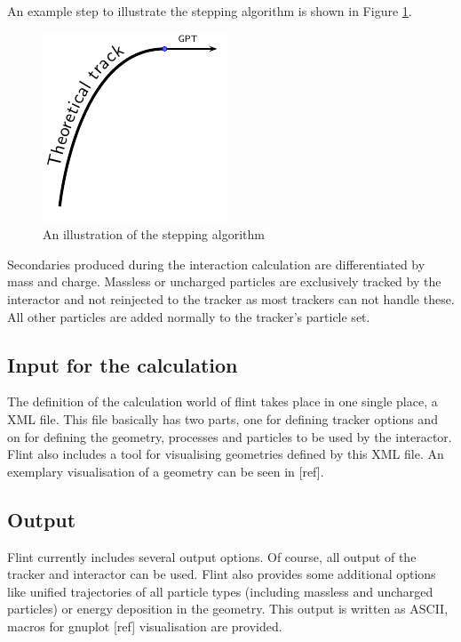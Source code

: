 \documentclass[3p, twocolumn, number, a4paper, 10pt, oneside, preprint]{elsarticle}
\begin{document}
An example step to illustrate the stepping algorithm is shown in Figure \ref{fig_stepping}.

\begin{figure}
	\centering
	\includegraphics[width=0.55\columnwidth, page=7]{img/stepping}
	\caption{An illustration of the stepping algorithm}
	\label{fig_stepping}
\end{figure}

Secondaries produced during the interaction calculation are differentiated by mass and charge. Massless or uncharged particles are exclusively tracked by the interactor and not reinjected to the tracker as most trackers can not handle these. All other particles are added normally to the tracker's particle set.


\subsection{Input for the calculation}
\label{input}

The definition of the calculation world of flint takes place in one single place, a XML file. This file basically has two parts, one for defining tracker options and on for defining the geometry, processes and particles to be used by the interactor. Flint also includes a tool for visualising geometries defined by this XML file. An exemplary visualisation of a geometry can be seen in [ref].

\subsection{Output}
\label{output}

Flint currently includes several output options. Of course, all output of the tracker and interactor can be used. Flint also provides some additional options like unified trajectories of all particle types (including massless and uncharged particles) or energy deposition in the geometry. This output is written as ASCII, macros for gnuplot [ref] visualisation are provided.
\end{document}
